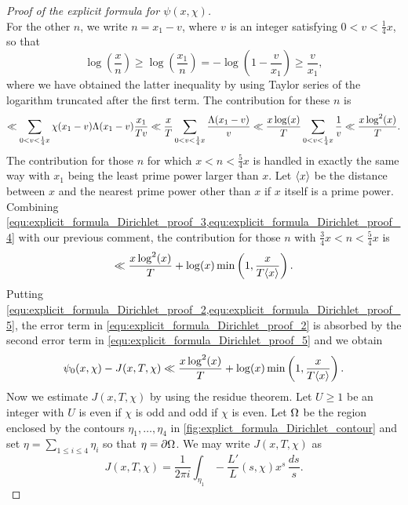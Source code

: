 \begin{proof}[Proof of the explicit formula for $\psi(x,\chi)$]
\begin{equation}
      \end{equation}
      For the other $n$, we write $n = x_{1}-v$, where $v$ is an integer satisfying $0 < v < \frac{1}{4}x$, so that
      \[
        \log\left(\frac{x}{n}\right) \ge \log\left(\frac{x_{1}}{n}\right) = -\log\left(1-\frac{v}{x_{1}}\right) \ge \frac{v}{x_{1}},
      \]
      where we have obtained the latter inequality by using Taylor series of the logarithm truncated after the first term. The contribution for these $n$ is
      \begin{equation}\label{equ:explicit_formula_Dirichlet_proof_4}
        \ll \sum_{0 < v < \frac{1}{4}x}\chi(x_{1}-v)\Lambda(x_{1}-v)\frac{x_{1}}{Tv} \ll \frac{x}{T}\sum_{0 < v < \frac{1}{4}x}\frac{\Lambda(x_{1}-v)}{v} \ll \frac{x\log(x)}{T}\sum_{0 < v < \frac{1}{4}x}\frac{1}{v} \ll \frac{x\log^{2}(x)}{T}.
      \end{equation}
      The contribution for those $n$ for which $x < n < \frac{5}{4}x$ is handled in exactly the same way with $x_{1}$ being the least prime power larger than $x$. Let $\langle x\rangle$ be the distance between $x$ and the nearest prime power other than $x$ if $x$ itself is a prime power. Combining \cref{equ:explicit_formula_Dirichlet_proof_3,equ:explicit_formula_Dirichlet_proof_4} with our previous comment, the contribution for those $n$ with $\frac{3}{4}x < n < \frac{5}{4}x$ is
      \begin{equation}\label{equ:explicit_formula_Dirichlet_proof_5}
        \ll \frac{x\log^{2}(x)}{T}+\log(x)\min\left(1,\frac{x}{T\langle x\rangle}\right).
      \end{equation}
      Putting \cref{equ:explicit_formula_Dirichlet_proof_2,equ:explicit_formula_Dirichlet_proof_5}, the error term in \cref{equ:explicit_formula_Dirichlet_proof_2} is absorbed by the second error term in \cref{equ:explicit_formula_Dirichlet_proof_5} and we obtain
      \begin{equation}\label{equ:explicit_formula_Dirichlet_proof_6}
        \psi_{0}(x,\chi)-J(x,T,\chi) \ll \frac{x\log^{2}(x)}{T}+\log(x)\min\left(1,\frac{x}{T\langle x\rangle}\right).
      \end{equation}
      Now we estimate $J(x,T,\chi)$ by using the residue theorem. Let $U \ge 1$ be an integer with $U$ is even if $\chi$ is odd and odd if $\chi$ is even. Let $\Omega$ be the region enclosed by the contours $\eta_{1},\ldots,\eta_{4}$ in \cref{fig:explict_formula_Dirichlet_contour} and set $\eta = \sum_{1 \le i \le 4}\eta_{i}$ so that $\eta = \partial \Omega$. We may write $J(x,T,\chi)$ as
      \[
        J(x,T,\chi) = \frac{1}{2\pi i}\int_{\eta_{1}}-\frac{L'}{L}(s,\chi)x^{s}\,\frac{ds}{s}.
      \]


\end{proof}
